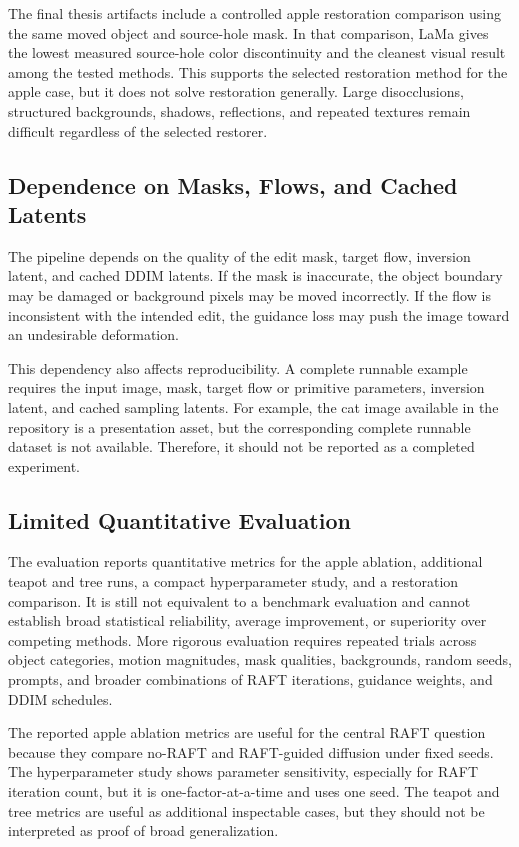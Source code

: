 The final thesis artifacts include a controlled apple restoration comparison using the same moved object and source-hole mask. In that comparison, LaMa gives the lowest measured source-hole color discontinuity and the cleanest visual result among the tested methods. This supports the selected restoration method for the apple case, but it does not solve restoration generally. Large disocclusions, structured backgrounds, shadows, reflections, and repeated textures remain difficult regardless of the selected restorer.

\subsection{Dependence on Masks, Flows, and Cached Latents}

The pipeline depends on the quality of the edit mask, target flow, inversion latent, and cached DDIM latents. If the mask is inaccurate, the object boundary may be damaged or background pixels may be moved incorrectly. If the flow is inconsistent with the intended edit, the guidance loss may push the image toward an undesirable deformation.

This dependency also affects reproducibility. A complete runnable example requires the input image, mask, target flow or primitive parameters, inversion latent, and cached sampling latents. For example, the cat image available in the repository is a presentation asset, but the corresponding complete runnable dataset is not available. Therefore, it should not be reported as a completed experiment.

\subsection{Limited Quantitative Evaluation}

The evaluation reports quantitative metrics for the apple ablation, additional teapot and tree runs, a compact hyperparameter study, and a restoration comparison. It is still not equivalent to a benchmark evaluation and cannot establish broad statistical reliability, average improvement, or superiority over competing methods. More rigorous evaluation requires repeated trials across object categories, motion magnitudes, mask qualities, backgrounds, random seeds, prompts, and broader combinations of RAFT iterations, guidance weights, and DDIM schedules.

The reported apple ablation metrics are useful for the central RAFT question because they compare no-RAFT and RAFT-guided diffusion under fixed seeds. The hyperparameter study shows parameter sensitivity, especially for RAFT iteration count, but it is one-factor-at-a-time and uses one seed. The teapot and tree metrics are useful as additional inspectable cases, but they should not be interpreted as proof of broad generalization.

